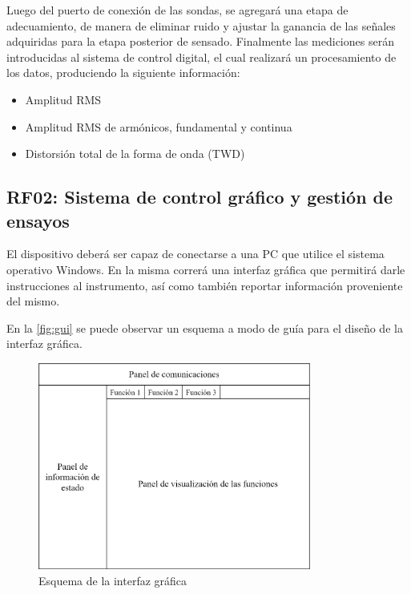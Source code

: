 \documentclass[titlepage, 12pt]{article}
\begin{document}
  Luego del puerto de conexión de las sondas, se agregará una etapa de adecuamiento, de manera de eliminar ruido y ajustar la ganancia de las señales adquiridas para la etapa posterior de sensado. Finalmente las mediciones serán introducidas al sistema de control digital, el cual realizará un procesamiento de los datos, produciendo la siguiente información:

    \begin{itemize}
      \item Amplitud RMS
      \item Amplitud RMS de armónicos, fundamental y continua
      \item Distorsión total de la forma de onda (TWD)
    \end{itemize}

  \subsection{RF02: Sistema de control gráfico y gestión de ensayos}
  El dispositivo deberá ser capaz de conectarse a una PC que utilice el sistema operativo Windows. En la misma correrá una interfaz gráfica que permitirá darle instrucciones al instrumento, así como también reportar información proveniente del mismo.

  En la \autoref{fig:gui} se puede observar un esquema a modo de guía para el diseño de la interfaz gráfica.

  \begin{figure}[!htbp]
    \centering
    \includegraphics[width=0.8\textwidth]{diagrams/gui.png}
    \caption{Esquema de la interfaz gráfica}
    \label{fig:gui}
  \end{figure}
\end{document}

